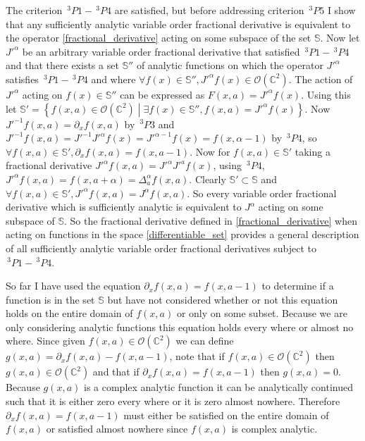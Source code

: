 \documentclass[%
 onecolumn,
 amsmath, amssymb, aps, pra, 10pt
]{revtex4-2}
\begin{document}
The criterion $\,^3P1 - \,^3P4$ are satisfied, but before addressing criterion $\,^3P5$ I show that any sufficiently analytic variable order fractional derivative is equivalent to the operator \eqref{fractional_derivative} acting on some subspace of the set $\mathbb{S}$. Now let $J'^{\alpha}$ be an arbitrary variable order fractional derivative that satisfied $\,^3P1 - \,^3P4$ and that there exists a set $\mathbb{S}''$ of analytic functions on which the operator $J'^{\alpha}$ satisfies $\,^3P1 - \,^3P4$ and where $\forall f(x) \in \mathbb{S}'', J'^{\alpha}f(x) \in \mathcal{O}(\mathbb{C}^2)$. The action of $J'^{\alpha}$ acting on $f(x) \in \mathbb{S}''$ can be expressed as $F(x, a) = J'^{\alpha} f(x)$. Using this let $\mathbb{S}' = \left\lbrace f(x, a) \in \mathcal{O}(\mathbb{C}^2) \middle| \exists f(x) \in \mathbb{S}'', f(x, a) = J'^{\alpha} f(x) \right\rbrace$. Now $J'^{-1}f(x, a) = \partial_x f(x, a)$ by $\,^3P3$ and $J'^{-1} f(x, a) = J'^{-1}J'^{\alpha} f(x) = J'^{\alpha - 1} f(x) = f(x, \alpha - 1)$ by $\,^3P4$, so $\forall f(x, a) \in \mathbb{S}', \partial_x f(x, a) = f(x, a - 1)$. Now for $f(x, a) \in \mathbb{S}'$ taking a fractional derivative $J'^{\alpha} f(x, a) = J'^{\alpha}J'^{a} f(x)$, using $\,^3P4$, $J'^{\alpha} f(x, a) = f(x, a + \alpha) = \Delta_{a}^{\alpha} f(x, a)$. Clearly $\mathbb{S}' \subset \mathbb{S}$ and $\forall f(x, a) \in \mathbb{S}', J'^{\alpha} f(x, a) = J^{\alpha} f(x, a)$. So every variable order fractional derivative which is sufficiently analytic is equivalent to $J^{\alpha}$ acting on some subspace of $\mathbb{S}$. So the fractional derivative defined in \eqref{fractional_derivative} when acting on functions in the space \eqref{differentiable_set} provides a general description of all sufficiently analytic variable order fractional derivatives subject to $\,^3P1 - \,^3P4$.

So far I have used the equation $\partial_x f(x, a) = f(x, a - 1)$ to determine if a function is in the set $\mathbb{S}$ but have not considered whether or not this equation holds on the entire domain of $f(x, a)$ or only on some subset. Because we are only considering analytic functions this equation holds every where or almost no where. Since given $f(x, a) \in \mathcal{O}(\mathbb{C}^2)$ we can define $g(x, a) = \partial_x f(x, a) - f(x, a - 1)$, note that if $f(x, a) \in \mathcal{O}(\mathbb{C}^2)$ then $g(x, a) \in \mathcal{O}(\mathbb{C}^2)$ and that if $\partial_x f(x, a) = f(x, a - 1)$ then $g(x, a) = 0$. Because $g(x, a)$ is a complex analytic function it can be analytically continued such that it is either zero every where or it is zero almost nowhere. Therefore $\partial_x f(x, a) = f(x, a - 1)$ must either be satisfied on the entire domain of $f(x, a)$ or satisfied almost nowhere since $f(x, a)$ is complex analytic.
\end{document}
